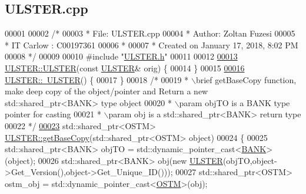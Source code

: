 \hypertarget{_u_l_s_t_e_r_8cpp_source}{}\subsection{U\+L\+S\+T\+E\+R.\+cpp}

\begin{DoxyCode}
00001 
00002 \textcolor{comment}{/* }
00003 \textcolor{comment}{ * File:   ULSTER.cpp}
00004 \textcolor{comment}{ * Author: Zoltan Fuzesi}
00005 \textcolor{comment}{ * IT Carlow : C00197361}
00006 \textcolor{comment}{ *}
00007 \textcolor{comment}{ * Created on January 17, 2018, 8:02 PM}
00008 \textcolor{comment}{ */}
00009 
00010 \textcolor{preprocessor}{#include "\hyperlink{_u_l_s_t_e_r_8h}{ULSTER.h}"}
00011 
00012 
\hypertarget{_u_l_s_t_e_r_8cpp_source.tex_l00013}{}\hyperlink{class_u_l_s_t_e_r_ad8847497742850609cd4748bbb6d0a8e_ad8847497742850609cd4748bbb6d0a8e}{00013} \hyperlink{class_u_l_s_t_e_r_a637ad8cb5537167ab51cd079637a8323_a637ad8cb5537167ab51cd079637a8323}{ULSTER::ULSTER}(\textcolor{keyword}{const} \hyperlink{class_u_l_s_t_e_r}{ULSTER}& orig) \{
00014 \}
00015 
\hypertarget{_u_l_s_t_e_r_8cpp_source.tex_l00016}{}\hyperlink{class_u_l_s_t_e_r_a4ceb68bdbc806f74f9e55096f8223453_a4ceb68bdbc806f74f9e55096f8223453}{00016} \hyperlink{class_u_l_s_t_e_r_a4ceb68bdbc806f74f9e55096f8223453_a4ceb68bdbc806f74f9e55096f8223453}{ULSTER::~ULSTER}() \{
00017 \}
00018 \textcolor{comment}{/*}
00019 \textcolor{comment}{ * \(\backslash\)brief getBaseCopy function, make deep copy of the object/pointer and Return a new std::shared\_ptr<BANK>
       type object}
00020 \textcolor{comment}{ * \(\backslash\)param objTO is a BANK type pointer for casting}
00021 \textcolor{comment}{ * \(\backslash\)param obj is a std::shared\_ptr<BANK> return type}
00022 \textcolor{comment}{ */}
\hypertarget{_u_l_s_t_e_r_8cpp_source.tex_l00023}{}\hyperlink{class_u_l_s_t_e_r_ad0c05e562b0c67283edfa4940c9aa728_ad0c05e562b0c67283edfa4940c9aa728}{00023} std::shared\_ptr<OSTM> \hyperlink{class_u_l_s_t_e_r_ad0c05e562b0c67283edfa4940c9aa728_ad0c05e562b0c67283edfa4940c9aa728}{ULSTER::getBaseCopy}(std::shared\_ptr<OSTM> \textcolor{keywordtype}{object})
00024 \{
00025     std::shared\_ptr<BANK> objTO = std::dynamic\_pointer\_cast<\hyperlink{class_b_a_n_k}{BANK}>(object);
00026     std::shared\_ptr<BANK> obj(\textcolor{keyword}{new} \hyperlink{class_u_l_s_t_e_r_a637ad8cb5537167ab51cd079637a8323_a637ad8cb5537167ab51cd079637a8323}{ULSTER}(objTO,object->Get\_Version(),\textcolor{keywordtype}{object}->Get\_Unique\_ID())); 
00027     std::shared\_ptr<OSTM> ostm\_obj = std::dynamic\_pointer\_cast<\hyperlink{class_o_s_t_m}{OSTM}>(obj);                             
           

\end{DoxyCode}
